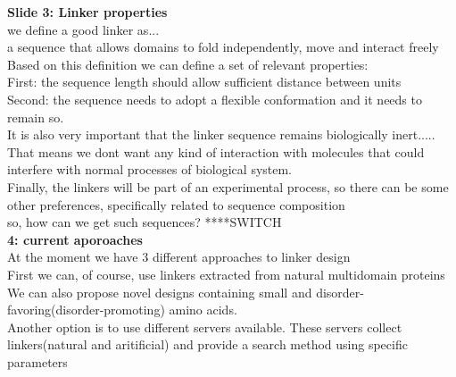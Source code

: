 \documentclass[a4paper,10pt]{article}
\begin{document}
\textbf{Slide 3: Linker properties}\\
we define a good linker as...\\
a sequence that allows domains to fold independently, move and interact freely\\
Based on this definition we can define a set of relevant properties:\\
First: the sequence length should allow sufficient distance between units\\
Second: the sequence needs to adopt a flexible conformation and it needs to remain so.\\
It is also very important that the linker sequence remains biologically inert.....
That means we dont want any kind of interaction with molecules that could interfere with normal processes of biological system.\\

Finally, the linkers will be part of an experimental process, so there can be some other preferences, specifically related to sequence composition \\

so, how can we get such sequences? ****SWITCH\\




\textbf{4: current aporoaches}\\
At the moment we have 3 different approaches to linker design\\
First we can, of course, use linkers extracted from natural multidomain proteins\\
We can also propose novel designs containing small and disorder-favoring(disorder-promoting) amino acids.\\
Another option is to use different servers available. These servers collect linkers(natural and aritificial) and provide a search method using specific parameters\\
\end{document}
